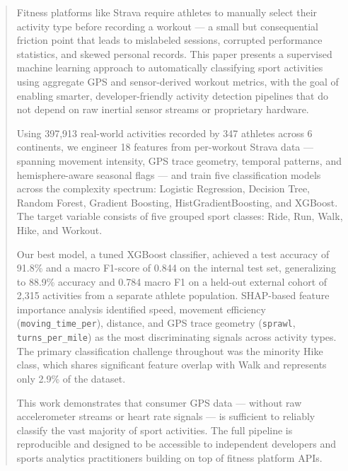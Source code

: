 \documentclass[11pt, onecolumn]{article}
\begin{document}
\begin{abstract}
Fitness platforms like Strava require athletes to manually select their activity 
type before recording a workout --- a small but consequential friction point that 
leads to mislabeled sessions, corrupted performance statistics, and skewed 
personal records. This paper presents a supervised machine learning approach to 
automatically classifying sport activities using aggregate GPS and sensor-derived 
workout metrics, with the goal of enabling smarter, developer-friendly activity 
detection pipelines that do not depend on raw inertial sensor streams or 
proprietary hardware.

Using 397,913 real-world activities recorded by 347 athletes across 6 continents, 
we engineer 18 features from per-workout Strava data --- spanning movement 
intensity, GPS trace geometry, temporal patterns, and hemisphere-aware seasonal 
flags --- and train five classification models across the complexity spectrum: 
Logistic Regression, Decision Tree, Random Forest, Gradient Boosting, 
HistGradientBoosting, and XGBoost. The target variable consists of five grouped 
sport classes: Ride, Run, Walk, Hike, and Workout.

Our best model, a tuned XGBoost classifier, achieved a test accuracy of 91.8\% 
and a macro F1-score of 0.844 on the internal test set, generalizing to 88.9\% 
accuracy and 0.784 macro F1 on a held-out external cohort of 2,315 activities 
from a separate athlete population. SHAP-based feature importance analysis 
identified speed, movement efficiency (\texttt{moving\_time\_per}), distance, 
and GPS trace geometry (\texttt{sprawl}, \texttt{turns\_per\_mile}) as the most 
discriminating signals across activity types. The primary classification 
challenge throughout was the minority Hike class, which shares significant 
feature overlap with Walk and represents only 2.9\% of the dataset.

This work demonstrates that consumer GPS data --- without raw accelerometer 
streams or heart rate signals --- is sufficient to reliably classify the vast 
majority of sport activities. The full pipeline is reproducible and designed to 
be accessible to independent developers and sports analytics practitioners 
building on top of fitness platform APIs.
\end{abstract}

\newpage
\tableofcontents
\newpage

\end{document}
